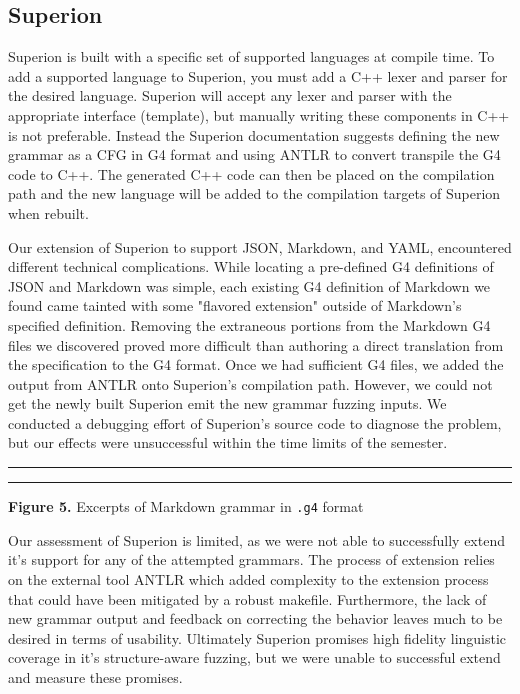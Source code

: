 \documentclass[12pt]{diazessay}
\begin{document}
\subsection*{Superion}

Superion is built with a specific set of supported languages at compile time.
To add a supported language to Superion, you must add a C++ lexer and parser for the desired language.
Superion will accept any lexer and parser with the appropriate interface (template), but manually writing these components in C++ is not preferable.
Instead the Superion documentation suggests defining the new grammar as a CFG in G4 format and using ANTLR\cite{parr2013definitive} to convert transpile the G4 code to C++.
The generated C++ code can then be placed on the compilation path and the new language will be added to the compilation targets of Superion when rebuilt.

Our extension of Superion to support JSON, Markdown, and YAML, encountered different technical complications.
While locating a pre-defined G4 definitions of JSON and Markdown was simple, each existing G4 definition of Markdown we found came tainted with some "flavored extension" outside of Markdown's specified definition.
Removing the extraneous portions from the Markdown G4 files we discovered proved more difficult than authoring a direct translation from the specification to the G4 format.
Once we had sufficient G4 files, we added the output from ANTLR onto Superion's compilation path.
However, we could not get the newly built Superion emit the new grammar fuzzing inputs.
We conducted a debugging effort of Superion's source code to diagnose the problem, but our effects were unsuccessful within the time limits of the semester.

\vspace{10mm}
\hrule height 0.4mm
\begingroup \fontsize{10pt}{10pt} \selectfont \begin{alltt}

\end{alltt} \vspace{-6mm} \endgroup \hrule height 0.4mm
\vspace{6mm}
\centerline{\textbf{Figure 5.} Excerpts of Markdown grammar in \texttt{.g4} format}
\vspace{6mm}

Our assessment of Superion is limited, as we were not able to successfully extend it's support for any of the attempted grammars.
The process of extension relies on the external tool ANTLR which added complexity to the extension process that could have been mitigated by a robust makefile.
Furthermore, the lack of new grammar output and feedback on correcting the behavior leaves much to be desired in terms of usability.
Ultimately Superion promises high fidelity linguistic coverage in it's structure-aware fuzzing, but we were unable to successful extend and measure these promises.
\end{document}

